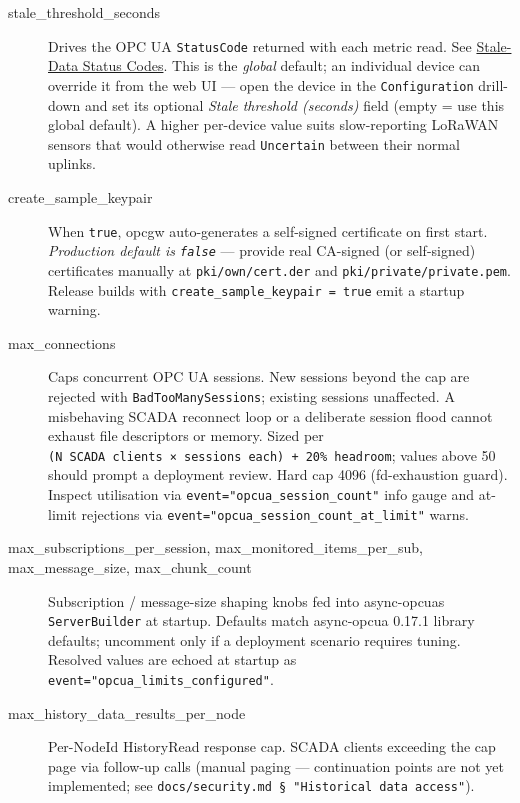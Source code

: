 \begin{description}
\item[stale\_threshold\_seconds]
Drives the OPC UA \texttt{StatusCode} returned with each metric read. See \hyperref[sec-staleness-status-codes]{Stale-Data Status Codes}. This is the \emph{global} default; an individual device can override it from the web UI --- open the device in the \texttt{Configuration} drill-down and set its optional \emph{Stale threshold (seconds)} field (empty = use this global default). A higher per-device value suits slow-reporting LoRaWAN sensors that would otherwise read \texttt{Uncertain} between their normal uplinks.
\item[create\_sample\_keypair]
When \texttt{true}, opcgw auto-generates a self-signed certificate on first start. \emph{Production default is \texttt{false}} --- provide real CA-signed (or self-signed) certificates manually at \texttt{pki/own/cert.der} and \texttt{pki/private/private.pem}. Release builds with \texttt{create\_sample\_keypair\ =\ true} emit a startup warning.
\item[max\_connections]
Caps concurrent OPC UA sessions. New sessions beyond the cap are rejected with \texttt{BadTooManySessions}; existing sessions unaffected. A misbehaving SCADA reconnect loop or a deliberate session flood cannot exhaust file descriptors or memory. Sized per \texttt{(N\ SCADA\ clients\ ×\ sessions\ each)\ +\ 20\%\ headroom}; values above 50 should prompt a deployment review. Hard cap 4096 (fd-exhaustion guard). Inspect utilisation via \texttt{event="opcua\_session\_count"} info gauge and at-limit rejections via \texttt{event="opcua\_session\_count\_at\_limit"} warns.
\item[max\_subscriptions\_per\_session, max\_monitored\_items\_per\_sub, max\_message\_size, max\_chunk\_count]
Subscription / message-size shaping knobs fed into async-opcua\textquotesingle s \texttt{ServerBuilder} at startup. Defaults match async-opcua 0.17.1 library defaults; uncomment only if a deployment scenario requires tuning. Resolved values are echoed at startup as \texttt{event="opcua\_limits\_configured"}.
\item[max\_history\_data\_results\_per\_node]
Per-NodeId HistoryRead response cap. SCADA clients exceeding the cap page via follow-up calls (manual paging --- continuation points are not yet implemented; see \texttt{docs/security.md\ §\ "Historical\ data\ access"}).
\end{description}

